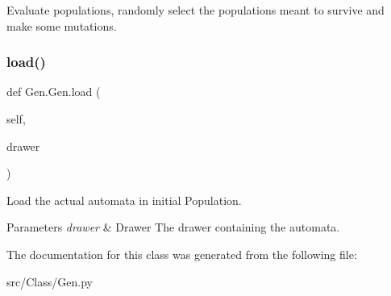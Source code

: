 Evaluate populations, randomly select the populations meant to survive and make some mutations. 

\mbox{\label{classGen_1_1Gen_a622c81f69a1c66c602b53c4e129d4ef0}} 
\subsubsection{\texorpdfstring{load()}{load()}}
{\footnotesize\ttfamily def Gen.\+Gen.\+load (\begin{DoxyParamCaption}\item[{}]{self,  }\item[{}]{drawer }\end{DoxyParamCaption})}



Load the actual automata in initial Population. 


\begin{DoxyParams}{Parameters}
{\em drawer} & Drawer The drawer containing the automata. \\
\hline
\end{DoxyParams}


The documentation for this class was generated from the following file\+:\begin{DoxyCompactItemize}
\item 
src/\+Class/Gen.\+py\end{DoxyCompactItemize}
